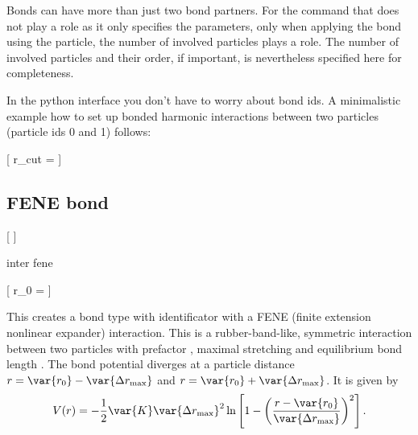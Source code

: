 Bonds can have more than just two bond partners. For the  command
that does not play a role as it only specifies the parameters, only when
applying the bond using the  particle, the number of involved
particles plays a role. The number of involved particles and their order, if
important, is nevertheless specified here for completeness.

In the python interface you don't have to worry about bond ids.
A minimalistic example how to set up bonded harmonic interactions between two particles (particle ids 0 and 1) follows:

\begin{pysyntax}
  [
    r_cut = 
  ]
\end{pysyntax}

\subsection{FENE bond}

\begin{pysyntax}
  [
  ]
\end{pysyntax}

\begin{essyntax}
  inter 
  fene
    
\end{essyntax}
\begin{pysyntax}
  [
    r_0 = 
  ]
\end{pysyntax}

This creates a bond type with identificator  with a
FENE (finite extension nonlinear expander) interaction. This is a
rubber-band-like, symmetric interaction between two particles with
prefactor , maximal stretching  and
equilibrium bond length .  The bond potential diverges at a
particle distance $r=\var{r_0}-\var{\Delta r_\mathrm{max}}$ and
$r=\var{r_0}+\var{\Delta r_\mathrm{max}}$. It is given by
\begin{equation}
  V(r) = -\frac{1}{2} \var{K} \var{\Delta r_\mathrm{max}}^2\ln \left[ 1 - \left(
      \frac{r-\var{r_0}}{\var{\Delta r_\mathrm{max}}} \right)^2 \right].
\end{equation}

